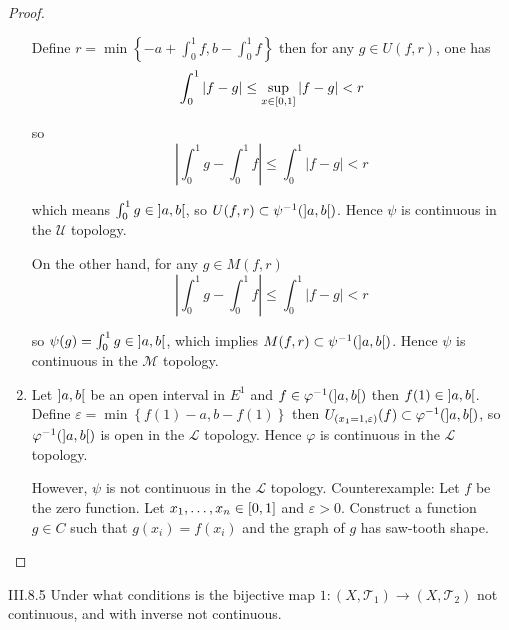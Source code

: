 \begin{proof}
\begin{enumerate}[label={(\alph*)}]
              Define \( r = \min\left\{ -a + \int_{0}^{1}f, b - \int_{0}^{1}f  \right\} \) then for any \( g \in U(f, r) \), one has
              \[
                  \int_{0}^{1}\left\vert f - g \right\vert \le \sup\limits_{x\in\left\lbrack{0,1}\right\rbrack} \left\vert f - g \right\vert < r
              \]

              so
              \[
                  \left\vert \int_{0}^{1} g - \int_{0}^{1} f \right\vert \le \int_{0}^{1} \left\vert f - g \right\vert < r
              \]

              which means \( \int_{0}^{1} g \in \left\rbrack{a,b}\right\lbrack \), so \( U(f, r) \subset \psi^{-1}(\left\rbrack{a, b}\right\lbrack) \). Hence \( \psi \) is continuous in the \( \mathscr{U} \) topology.

              On the other hand, for any \( g \in M(f, r) \)
              \[
                  \left\vert \int_{0}^{1} g - \int_{0}^{1} f \right\vert \le \int_{0}^{1} \left\vert f - g \right\vert < r
              \]

              so \( \psi(g) = \int_{0}^{1} g \in \left\rbrack{a, b}\right\lbrack \), which implies \( M(f, r) \subset \psi^{-1}(\left\rbrack{a, b}\right\lbrack) \). Hence \( \psi \) is continuous in the \( \mathscr{M} \) topology.
        \item Let \( \left\rbrack{a, b}\right\lbrack \) be an open interval in \( E^{1} \) and \( f \in \varphi^{-1}(\left\rbrack{a, b}\right\lbrack) \) then \( f(1) \in \left\rbrack{a, b}\right\lbrack \). Define \( \varepsilon = \min\left\{ f(1) - a, b - f(1) \right\} \) then \( U_{(x_{1} = 1, \varepsilon)}(f) \subset \varphi^{-1}(\left\rbrack{a, b}\right\lbrack) \), so \( \varphi^{-1}(\left\rbrack{a, b}\right\lbrack) \) is open in the \( \mathscr{L} \) topology. Hence \( \varphi \) is continuous in the \( \mathscr{L} \) topology.

              However, \( \psi \) is not continuous in the \( \mathscr{L} \) topology. Counterexample: Let \( f \) be the zero function. Let \( x_{1}, \ldots, x_{n} \in \left\lbrack{0,1}\right\rbrack \) and \( \varepsilon > 0 \). Construct a function \( g \in C \) such that \( g(x_{i}) = f(x_{i}) \) and the graph of \( g \) has saw-tooth shape.
    \end{enumerate}
\end{proof}

\begin{problem}{III.8.5}
Under what conditions is the bijective map \( 1: (X, \mathscr{T}_{1}) \to (X, \mathscr{T}_{2}) \) not continuous, and with inverse not continuous.
\end{problem}

